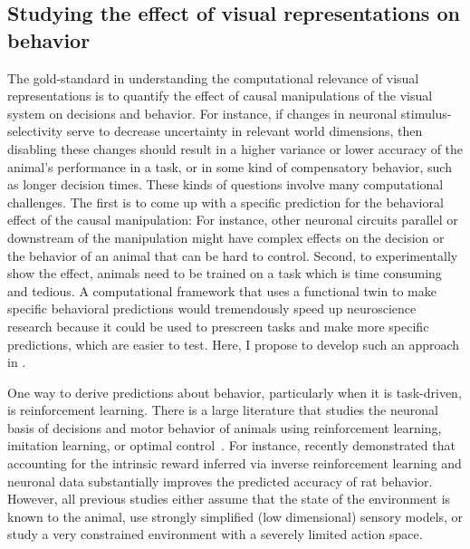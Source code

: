 \documentclass[B2,COG]{ercgrant}
\begin{document}
\subsection{Studying the effect of visual representations on behavior}
The gold-standard in understanding the computational relevance of visual representations  is to quantify the effect of causal manipulations of the visual system on decisions and behavior. 
For instance, if changes in neuronal stimulus-selectivity serve to decrease uncertainty in relevant world dimensions, then disabling these changes should result in a higher variance or lower accuracy of the animal's performance in a task, or in some kind of compensatory behavior, such as longer decision times.
These kinds of questions involve many computational  challenges. 
The first is to come up with a specific prediction for the behavioral effect of the causal manipulation: For instance, other neuronal circuits parallel or downstream of the manipulation might have complex effects on the decision or the behavior of an animal that can be hard to control. 
Second, to experimentally show the effect, animals need to be trained on a task which is time consuming and tedious. 
A computational framework that uses a functional twin to make specific behavioral predictions would tremendously speed up neuroscience research because it could be used to prescreen tasks and make more specific predictions, which are easier to test. 
Here, I propose to develop such an approach in . 

One way to derive predictions about behavior, particularly when it is task-driven, is reinforcement learning.
There is a large literature that studies the neuronal basis of decisions and motor behavior of animals using reinforcement learning, imitation learning, or optimal control~\parencite{Schultz1997-xu,Todorov2004-yb, Morris2006-ub, Botvinick2009-nn, Yamaguchi2018-xp, Miyazaki2018-gy}.
For instance, \textcite{Kalweit2022-ev} recently demonstrated that accounting for the intrinsic reward inferred via inverse reinforcement learning and neuronal data substantially improves the predicted accuracy of rat behavior.
However, all previous studies either assume that the state of the environment is known to the animal, use strongly simplified (low dimensional) sensory models, or study a very constrained environment with a severely limited action space. 
\end{document}
